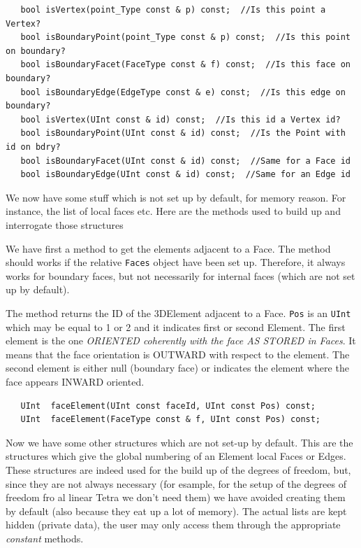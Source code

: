 \begin{verbatim}
   bool isVertex(point_Type const & p) const;  //Is this point a Vertex?
   bool isBoundaryPoint(point_Type const & p) const;  //Is this point on boundary?
   bool isBoundaryFacet(FaceType const & f) const;  //Is this face on boundary?
   bool isBoundaryEdge(EdgeType const & e) const;  //Is this edge on boundary?
   bool isVertex(UInt const & id) const;  //Is this id a Vertex id?
   bool isBoundaryPoint(UInt const & id) const;  //Is the Point with id on bdry?
   bool isBoundaryFacet(UInt const & id) const;  //Same for a Face id
   bool isBoundaryEdge(UInt const & id) const;  //Same for an Edge id
\end{verbatim}
We now have some stuff which is not set up by default, for memory
reason. For instance, the list of local faces etc. Here are the
methods used to build up and interrogate those structures

We have first a method to get the elements adjacent to a Face. The
method should works if the relative \texttt{Faces} object have been
set up. Therefore, it always works for boundary faces, but not
necessarily for internal faces (which are not set up by default).
 
The method returns the ID of the 3DElement adjacent to a Face.
\texttt{Pos} is an \texttt{UInt} which may be equal to 1 or 2 and it
indicates first or second Element. The first element is the one
\emph{ORIENTED coherently with the face AS STORED in Faces}. It means that
the face orientation is OUTWARD with respect to the element. The second
element is either null (boundary face) or indicates the element where
the face appears INWARD oriented.

\begin{verbatim}
   UInt  faceElement(UInt const faceId, UInt const Pos) const; 
   UInt  faceElement(FaceType const & f, UInt const Pos) const;  
\end{verbatim}

Now we have some other structures which are not set-up by default.  This
are the structures which give the global numbering of an Element local
Faces or Edges. These structures are indeed used for the build up of the
degrees of freedom, but, since they are not always necessary (for
esample, for the setup of the degrees of freedom fro al linear Tetra we
don't need them) we have avoided creating them by default (also because
they eat up a lot of memory).  The actual lists are kept hidden (private
data), the user may only access them through the appropriate
\emph{constant} methods.


